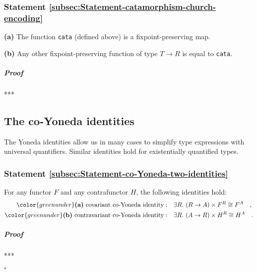\subsubsection{Statement \label{subsec:Statement-catamorphism-church-encoding}\ref{subsec:Statement-catamorphism-church-encoding}}

\textbf{(a)} The function \lstinline!cata!
(defined above) is a fixpoint-preserving map.

\textbf{(b)} Any other fixpoint-preserving function of type $T\rightarrow R$
is equal to \lstinline!cata!.

\subparagraph{Proof}

{*}{*}{*}

\subsection{The co-Yoneda identities}

The Yoneda identities allow us in many cases to simplify type expressions
with universal quantifiers. Similar identities hold for existentially
quantified types. 

\subsubsection{Statement \label{subsec:Statement-co-Yoneda-two-identities}\ref{subsec:Statement-co-Yoneda-two-identities}}

For any functor $F$ and any contrafunctor $H$, the following identities
hold:
\begin{align*}
{\color{greenunder}\text{\textbf{(a)} }\text{covariant co-Yoneda identity}:}\quad & \exists R.\,\left(R\rightarrow A\right)\times F^{R}\cong F^{A}\quad,\\
{\color{greenunder}\text{\textbf{(b)} }\text{contravariant co-Yoneda identity}:}\quad & \exists R.\,\left(A\rightarrow R\right)\times H^{R}\cong H^{A}\quad.
\end{align*}


\subparagraph{Proof}

{*}{*}{*}

$\square$

